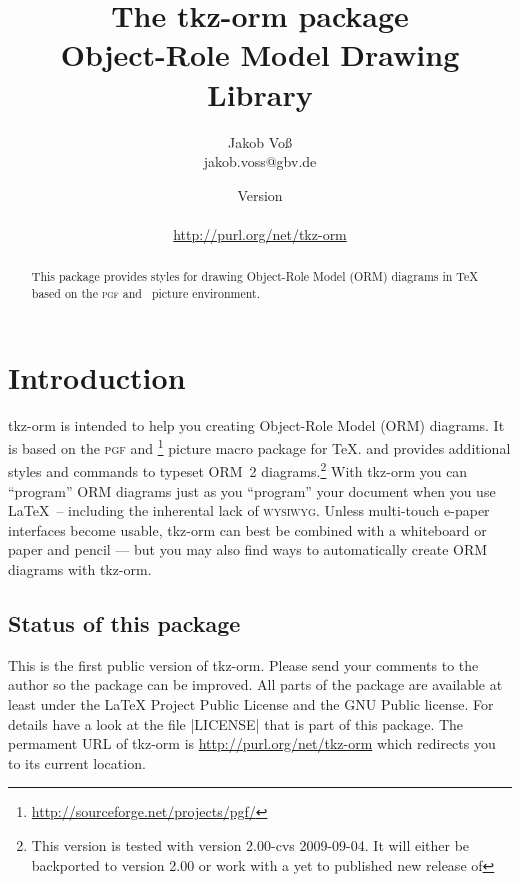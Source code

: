 \documentclass[a4paper,10pt]{article}
\title{The \textsf{tkz-orm} package\\Object-Role Model Drawing Library}
\author{Jakob Vo\ss\\{\footnotesize jakob.voss@gbv.de}}
\date{Version \ormVersion\\\ormDate\\[5mm]\url{http://purl.org/net/tkz-orm}}
\begin{document}
\maketitle

\begin{abstract}
This package provides styles for drawing Object-Role Model (ORM)
diagrams in \TeX{} based on the \textsc{pgf} and \tikzname\ picture environment.
\end{abstract}

\tableofcontents
\pagebreak

\section{Introduction}
\label{sec:introduction}

\textsf{tkz-orm} is intended to help you creating Object-Role Model (ORM) diagrams. It is based on the \textsc{pgf} and \tikzname\footnote{\url{http://sourceforge.net/projects/pgf/}} picture macro package for \TeX. and provides additional styles and commands to typeset ORM~2 diagrams.\footnote{This version is tested with \tikzname{} version 2.00-cvs 2009-09-04. It will either be backported to \tikzname{} version 2.00 or work with a yet to published new release of \tikzname{}} With \textsf{tkz-orm} you can ``program'' ORM diagrams just as you ``program'' your document when you use \LaTeX\ -- including the inherental lack of \textsc{wysiwyg}. Unless multi-touch e-paper interfaces become usable, \textsf{tkz-orm} can best be combined with a whiteboard or paper and pencil --- but you may also find ways to automatically create ORM diagrams with \textsf{tkz-orm}.

\subsection*{Status of this package}
This is the first public version of \textsf{tkz-orm}. Please send your comments to the author so the package can be improved. All parts of the package are available at least under the \LaTeX{} Project Public License\cite{LPPL} and the GNU Public license\cite{GPL2}. For details have a look at the file |LICENSE| that is part of this package. The permament URL of \textsf{tkz-orm} is \url{http://purl.org/net/tkz-orm} which redirects you to its current location.
\end{document}
